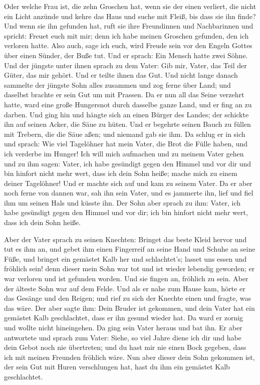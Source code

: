  Oder welche Frau ist, die zehn Groschen hat, wenn sie der
einen verliert, die nicht ein Licht anzünde und kehre das Haus und suche
mit Fleiß, bis dass sie ihn finde?  Und wenn sie ihn
gefunden hat, ruft sie ihre Freundinnen und Nachbarinnen und spricht:
Freuet euch mit mir; denn ich habe meinen Groschen gefunden, den ich
verloren hatte.  Also auch, sage ich euch, wird Freude
sein vor den Engeln Gottes über einen Sünder, der Buße tut.
 Und er sprach: Ein Mensch hatte zwei Söhne.
 Und der jüngste unter ihnen sprach zu dem Vater: Gib
mir, Vater, das Teil der Güter, das mir gehört. Und er teilte ihnen das
Gut.  Und nicht lange danach sammelte der jüngste Sohn
alles zusammen und zog ferne über Land; und daselbst brachte er sein Gut
um mit Prassen.  Da er nun all das Seine verzehrt hatte,
ward eine große Hungersnot durch dasselbe ganze Land, und er fing an zu
darben.  Und ging hin und hängte sich an einen Bürger des
Landes; der schickte ihn auf seinen Acker, die Säue zu hüten.
 Und er begehrte seinen Bauch zu füllen mit Trebern, die
die Säue aßen; und niemand gab sie ihm.  Da schlug er in
sich und sprach: Wie viel Tagelöhner hat mein Vater, die Brot die Fülle
haben, und ich verderbe im Hunger!  Ich will mich
aufmachen und zu meinem Vater gehen und zu ihm sagen: Vater, ich habe
gesündigt gegen den Himmel und vor dir  und bin hinfort
nicht mehr wert, dass ich dein Sohn heiße; mache mich zu einem deiner
Tagelöhner!  Und er machte sich auf und kam zu seinem
Vater. Da er aber noch ferne von dannen war, sah ihn sein Vater, und es
jammerte ihn, lief und fiel ihm um seinen Hals und küsste ihn.
 Der Sohn aber sprach zu ihm: Vater, ich habe gesündigt
gegen den Himmel und vor dir; ich bin hinfort nicht mehr wert, dass ich
dein Sohn heiße.

 Aber der Vater sprach zu seinen Knechten: Bringet das
beste Kleid hervor und tut es ihm an, und gebet ihm einen Fingerreif an
seine Hand und Schuhe an seine Füße,  und bringet ein
gemästet Kalb her und schlachtet's; lasset uns essen und fröhlich sein!
 denn dieser mein Sohn war tot und ist wieder lebendig
geworden; er war verloren und ist gefunden worden. Und sie fingen an,
fröhlich zu sein.  Aber der älteste Sohn war auf dem
Felde. Und als er nahe zum Hause kam, hörte er das Gesänge und den
Reigen;  und rief zu sich der Knechte einen und fragte,
was das wäre.  Der aber sagte ihm: Dein Bruder ist
gekommen, und dein Vater hat ein gemästet Kalb geschlachtet, dass er ihn
gesund wieder hat.  Da ward er zornig und wollte nicht
hineingehen. Da ging sein Vater heraus und bat ihn.  Er
aber antwortete und sprach zum Vater: Siehe, so viel Jahre diene ich dir
und habe dein Gebot noch nie übertreten; und du hast mir nie einen Bock
gegeben, dass ich mit meinen Freunden fröhlich wäre.  Nun
aber dieser dein Sohn gekommen ist, der sein Gut mit Huren verschlungen
hat, hast du ihm ein gemästet Kalb geschlachtet.

